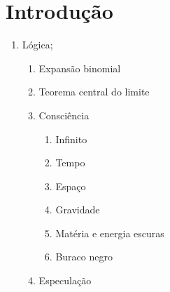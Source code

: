 \section*{Introdução}
\lipsum[1] \cite{brasilescola_parmenides}

\begin{enumerate}[label*=\arabic*.]
   \item Lógica;
   \begin{enumerate}[label*=\arabic*.]
   \item Expansão binomial
   \item Teorema central do limite
   \item Consciência
   \begin{enumerate}[label*=\arabic*.]
   \item Infinito
   \item Tempo
   \item Espaço
   \item Gravidade
   \item Matéria e energia escuras
   \item Buraco negro
   \end{enumerate}   
   \item Especulação
   \end{enumerate}
\end{enumerate}